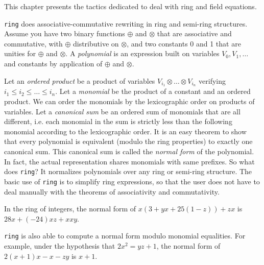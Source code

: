 \label{ring}

This chapter presents the tactics dedicated to deal with ring and
field equations.


\texttt{ring} does associative-commutative rewriting in ring and semi-ring
structures. Assume you have two binary functions $\oplus$ and $\otimes$
that are associative and commutative, with $\oplus$ distributive on
$\otimes$, and two constants 0 and 1 that are unities for $\oplus$ and
$\otimes$. A \textit{polynomial} is an expression built on variables $V_0, V_1,
\dots$ and constants by application of $\oplus$ and $\otimes$.

Let an {\it ordered product} be a product of variables $V_{i_1}
\otimes \ldots \otimes V_{i_n}$ verifying $i_1 \le i_2 \le \dots \le
i_n$. Let a \textit{monomial} be the product of a constant and an
ordered product.  We can order the monomials by the lexicographic
order on products of variables. Let a \textit{canonical sum} be an
ordered sum of monomials that are all different, i.e. each monomial in
the sum is strictly less than the following monomial according to the
lexicographic order. It is an easy theorem to show that every
polynomial is equivalent (modulo the ring properties) to exactly one
canonical sum. This canonical sum is called the \textit{normal form}
of the polynomial. In fact, the actual representation shares monomials
with same prefixes. So what does \texttt{ring}? It normalizes
polynomials over any ring or semi-ring structure. The basic use of
\texttt{ring} is to simplify ring expressions, so that the user does
not have to deal manually with the theorems of associativity and
commutativity.

\begin{Examples}
\item In the ring of integers, the normal form of 
$x (3 + yx + 25(1 - z)) + zx$ is $28x + (-24)xz + xxy$.
\end{Examples}

\texttt{ring} is also able to compute a normal form modulo monomial 
equalities. For example, under the hypothesis that $2x^2 = yz+1$,
 the normal form of $2(x + 1)x - x - zy$ is $x+1$.


